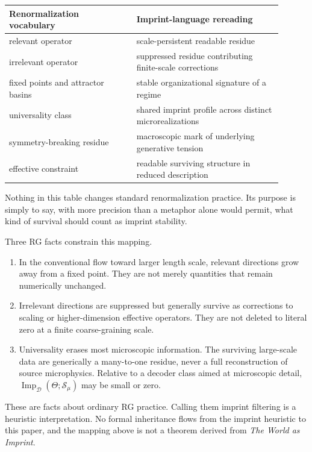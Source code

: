\documentclass[12pt,a4paper]{article}
\begin{document}
\begin{center}
\begin{tabular}{P{0.42\linewidth}P{0.48\linewidth}}
\toprule
\textbf{Renormalization vocabulary} & \textbf{Imprint-language rereading} \\
\midrule
relevant operator & scale-persistent readable residue \\
irrelevant operator & suppressed residue contributing finite-scale corrections \\
fixed points and attractor basins & stable organizational signature of a regime \\
universality class & shared imprint profile across distinct microrealizations \\
symmetry-breaking residue & macroscopic mark of underlying generative tension \\
effective constraint & readable surviving structure in reduced description \\
\bottomrule
\end{tabular}
\end{center}

Nothing in this table changes standard renormalization practice. Its purpose is simply to say, with more precision than a metaphor alone would permit, what kind of survival should count as imprint stability.

Three RG facts constrain this mapping.

\begin{enumerate}
\item In the conventional flow toward larger length scale, relevant
directions grow away from a fixed point. They are not merely quantities
that remain numerically unchanged.
\item Irrelevant directions are suppressed but generally survive as
corrections to scaling or higher-dimension effective operators. They are
not deleted to literal zero at a finite coarse-graining scale.
\item Universality erases most microscopic information. The surviving
large-scale data are generically a many-to-one residue, never a full
reconstruction of source microphysics. Relative to a decoder class aimed
at microscopic detail,
\(\operatorname{Imp}_{\mathcal D}(\Theta;\mathcal S_\mu)\) may be small
or zero.
\end{enumerate}

These are facts about ordinary RG practice. Calling them imprint
filtering is a heuristic interpretation. No formal inheritance flows
from the imprint heuristic to this paper, and the mapping above is not a
theorem derived from \emph{The World as Imprint}.
\end{document}
